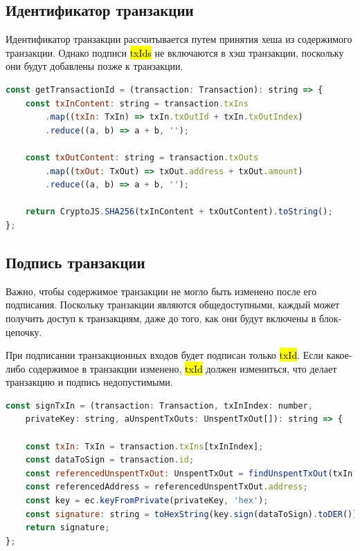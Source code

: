 \documentclass{article}
\begin{document}
\subsection{Идентификатор транзакции}

Идентификатор транзакции рассчитывается путем принятия хеша из содержимого транзакции. Однако подписи \hl{txIds} не включаются в хэш транзакции, поскольку они будут добавлены позже к транзакции.

\begin{lstlisting}[language=JavaScript, caption={Генерирование идентификатора транзакции.}]
const getTransactionId = (transaction: Transaction): string => {
	const txInContent: string = transaction.txIns
		.map((txIn: TxIn) => txIn.txOutId + txIn.txOutIndex)
		.reduce((a, b) => a + b, '');
	
	const txOutContent: string = transaction.txOuts
		.map((txOut: TxOut) => txOut.address + txOut.amount)
		.reduce((a, b) => a + b, '');
	
	return CryptoJS.SHA256(txInContent + txOutContent).toString();
};
\end{lstlisting}

\subsection{Подпись транзакции}

Важно, чтобы содержимое транзакции не могло быть изменено после его подписания. Поскольку транзакции являются общедоступными, каждый может получить доступ к транзакциям, даже до того, как они будут включены в блок-цепочку.

При подписании транзакционных входов будет подписан только \hl{txId}. Если какое-либо содержимое в транзакции изменено, \hl{txId} должен измениться, что делает транзакцию и подпись недопустимыми.

\begin{lstlisting}[language=JavaScript, caption={Подписание входа транзакции.}]
const signTxIn = (transaction: Transaction, txInIndex: number,
	privateKey: string, aUnspentTxOuts: UnspentTxOut[]): string => {
	
	const txIn: TxIn = transaction.txIns[txInIndex];
	const dataToSign = transaction.id;
	const referencedUnspentTxOut: UnspentTxOut = findUnspentTxOut(txIn.txOutId, txIn.txOutIndex, aUnspentTxOuts);
	const referencedAddress = referencedUnspentTxOut.address;
	const key = ec.keyFromPrivate(privateKey, 'hex');
	const signature: string = toHexString(key.sign(dataToSign).toDER());
	return signature;
};
\end{lstlisting}
\end{document}
